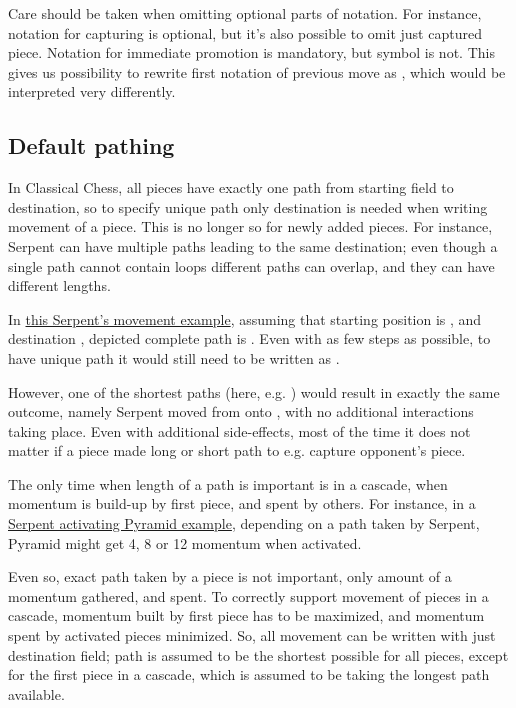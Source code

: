 Care should be taken when omitting optional parts of notation. For instance,
notation for capturing is optional, but it's also possible to omit just captured
piece. Notation for immediate promotion is mandatory, but symbol is not. This
gives us possibility to rewrite first notation of previous move as ,
which would be interpreted very differently.

\subsection*{Default pathing}
\label{sec:Appendix/Notation/Default pathing}

In Classical Chess, all pieces have exactly one path from starting field to destination,
so to specify unique path only destination is needed when writing movement of a piece.
This is no longer so for newly added pieces. For instance, Serpent can have multiple
paths leading to the same destination; even though a single path cannot contain loops
different paths can overlap, and they can have different lengths.

In \hyperref[fig:scn_tr_05_serpent_end]{this Serpent's movement example}, assuming that
starting position is , and destination , depicted complete path is
. Even with as few steps as possible, to have unique path
it would still need to be written as .

However, one of the shortest paths (here, e.g.\newline
{}) would result in exactly the same outcome, namely Serpent moved from
 onto , with no additional interactions taking place. Even with additional
side-effects, most of the time it does not matter if a piece made long or short path to e.g.
capture opponent's piece.

The only time when length of a path is important is in a cascade, when momentum is build-up
by first piece, and spent by others. For instance, in a
\hyperref[fig:scn_tr_12_serpent_path_short]{Serpent activating Pyramid example}, depending on
a path taken by Serpent, Pyramid might get 4, 8 or 12 momentum when activated.

Even so, exact path taken by a piece is not important, only amount of a momentum gathered,
and spent. To correctly support movement of pieces in a cascade, momentum built by first
piece has to be maximized, and momentum spent by activated pieces minimized. So, all movement
can be written with just destination field; path is assumed to be the shortest possible for
all pieces, except for the first piece in a cascade, which is assumed to be taking the longest
path available.

